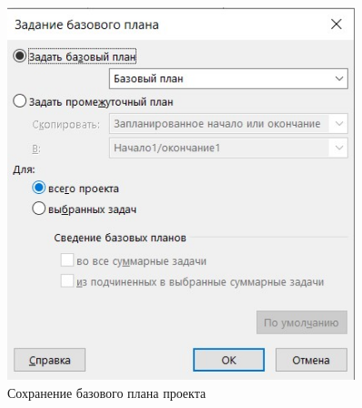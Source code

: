 \begin{figure}[H]
	\centering
	\includegraphics[width=0.9\textwidth]{img/task3/screen8.jpg}
	\caption{Сохранение базового плана проекта}
	\label{fig:screen3_8}
\end{figure}